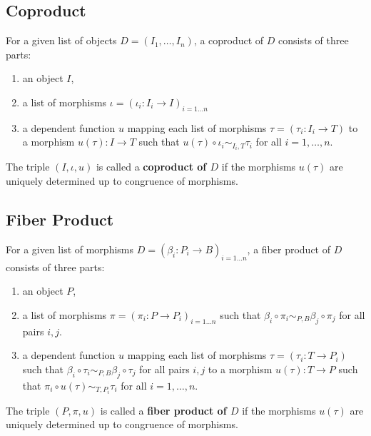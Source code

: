 \subsection{Coproduct}

\begin{definition}
 For a given list of objects $D = ( I_1, \dots, I_n )$, a coproduct of $D$ consists of three parts:
 \begin{enumerate}
  \item an object $I$,
  \item a list of morphisms $\iota = ( \iota_i: I_i \rightarrow I )_{i = 1 \dots n}$
  \item a dependent function $u$ mapping each list of morphisms $\tau = ( \tau_i: I_i \rightarrow T )$
  to a morphism $u( \tau ): I \rightarrow T$ such that $u( \tau ) \circ \iota_i \sim_{I_i, T} \tau_i$ for all $i = 1, \dots, n$.
 \end{enumerate}
 The triple $( I, \iota, u )$ is called a \textbf{coproduct of $D$} if the morphisms $u( \tau )$ are uniquely determined up to
 congruence of morphisms.
\end{definition}

\subsection{Fiber Product}

\begin{definition}
 For a given list of morphisms $D = ( \beta_i: P_i \rightarrow B )_{i = 1 \dots n}$, 
 a fiber product of $D$ consists of three parts:
 \begin{enumerate}
  \item an object $P$,
  \item a list of morphisms $\pi = ( \pi_i: P \rightarrow P_i )_{i = 1 \dots n}$ such that
        $\beta_i \circ \pi_i  \sim_{P, B} \beta_j \circ \pi_j$ for all pairs $i,j$.
  \item a dependent function $u$ mapping each list of morphisms
        $\tau = ( \tau_i: T \rightarrow P_i )$ such that
        $\beta_i \circ \tau_i  \sim_{P, B} \beta_j \circ \tau_j$ for all pairs $i,j$
        to a morphism $u( \tau ): T \rightarrow P$ such that
        $\pi_i \circ u( \tau ) \sim_{T, P_i} \tau_i$ for all $i = 1, \dots, n$.
 \end{enumerate}
 The triple $( P, \pi, u )$ is called a \textbf{fiber product of $D$} if the morphisms $u( \tau )$ are uniquely determined up to
 congruence of morphisms.
\end{definition}

